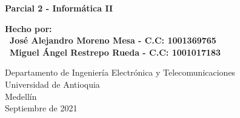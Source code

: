 \documentclass{article}
\begin{document}
\begin{titlepage}
    \begin{center}
        \vspace*{1cm}
            
        \Huge

 \textbf{Parcial 2 - Informática II}
            
        \vspace{0.5cm}
        \LARGE
        
            
        \vspace{1.5cm}
            
        \textbf{Hecho por: \\\
        José Alejandro Moreno Mesa - C.C: 1001369765\\\
        Miguel Ángel Restrepo Rueda - C.C: 1001017183
        }
            
        \vfill
            
        \vspace{0.8cm}
            
        \Large
        Departamento de Ingeniería Electrónica y Telecomunicaciones\\
        Universidad de Antioquia\\
        Medellín\\
        Septiembre de 2021
            
    \end{center}
\end{titlepage}
\tableofcontents
\newpage
\end{document}
